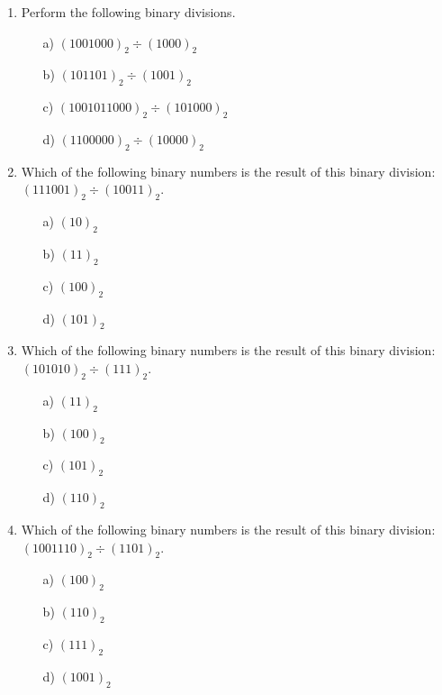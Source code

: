 \documentclass[]{report}
\begin{document}
\begin{enumerate}

\item Perform the following binary divisions.
\begin{multicols}{2}
\begin{itemize}
\item[a)] $(1001000)_{2} \div ( 1000)_{2}$
\item[b)] $(101101)_{2} \div (1001)_{2}$
\item[c)] $(1001011000)_{2} \div (101000)_{2}$
\item[d)] $(1100000)_{2} \div (10000)_{2}$
\end{itemize}
\end{multicols}

\item Which of the following binary numbers is the result of this binary division: $(111001)_{2} \div ( 10011)_{2}$. %
\begin{multicols}{2}
\begin{itemize}
\item[a)] $(10)_2$ %
\item[b)] $(11)_{2}$ %
\item[c)] $(100)_{2}$ %
\item[d)] $(101)_{2}$ %
\end{itemize}
\end{multicols}
\item Which of the following binary numbers is the result of this binary division: $(101010)_{2} \div ( 111 )_{2}$. %
\begin{multicols}{2}
\begin{itemize}
\item[a)] $(11)_2$ %
\item[b)] $(100)_{2}$ %
\item[c)] $(101)_{2}$ %
\item[d)] $(110)_{2}$ %
\end{itemize}
\end{multicols}
\item Which of the following binary numbers is the result of this binary division: $(1001110)_{2} \div ( 1101 )_{2}$. %
\begin{multicols}{2}
\begin{itemize}

\item[a)] $(100)_{2}$ %
\item[b)] $(110)_{2}$ %
\item[c)] $(111)_{2}$ %
\item[d)] $(1001)_2$ %
\end{itemize}
\end{multicols}
\end{enumerate}
\end{document}
